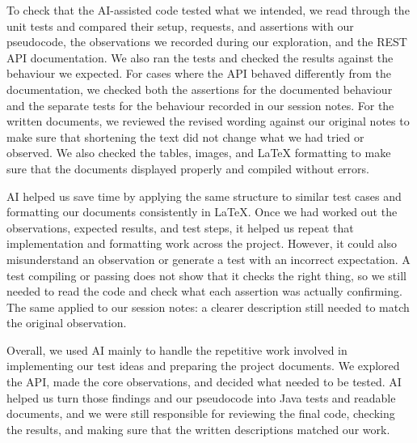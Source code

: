 \documentclass[12pt,letterpaper]{article}
\begin{document}
To check that the AI-assisted code tested what we intended, we read through the
unit tests and compared their setup, requests, and assertions with our pseudocode,
the observations we recorded during our exploration, and the REST API documentation.
We also ran the tests and checked
the results against the behaviour we expected. For cases where the API behaved
differently from the documentation, we checked both the assertions for the
documented behaviour and the separate tests for the behaviour recorded in our
session notes. For the written documents, we reviewed the revised wording against
our original notes to make sure that shortening the text did not change what we
had tried or observed. We also checked the tables, images, and LaTeX formatting
to make sure that the documents displayed properly and compiled without errors.

AI helped us save time by applying the same structure to similar test cases and
formatting our documents consistently in LaTeX. Once we had worked out the
observations, expected results, and test steps, it helped us repeat that
implementation and formatting work across the project. However, it could
also misunderstand an observation or generate a test with an incorrect
expectation. A test compiling or passing does not show that it checks the right
thing, so we still needed to read the code and check what each assertion was
actually confirming. The same applied to our session notes: a clearer description
still needed to match the original observation.

Overall, we used AI mainly to handle the repetitive work involved in implementing
our test ideas and preparing the project documents. We explored the API, made the
core observations, and decided what needed to be tested. AI helped us turn those
findings and our pseudocode into Java tests and readable documents, and we were
still responsible for reviewing the final code, checking the results, and making
sure that the written descriptions matched our work.
\par
\endgroup
\end{document}
